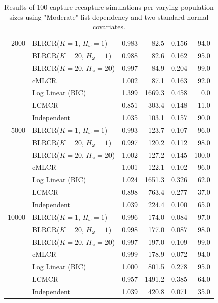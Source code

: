 \documentclass[
  12pt,
]{article}
\begin{document}
\begin{table}[H]
\begin{tabular}{||r l r r r r||}
\hline
2000    & BLRCR($K=1$, $H_\omega=1$)  & 0.983   & 82.5   & 0.156   & 94.0 \\ 
               & BLRCR($K=20$, $H_\omega=1$)   & 0.988     & 82.6     & 0.162     & 95.0 \\ 
               & BLRCR($K=20$, $H_\omega=20$)    & 0.997     & 84.9     & 0.204     & 99.0 \\  
               & cMLCR       & 1.002       & 87.1      & 0.163      & 92.0 \\
               & Log Linear (BIC)  & 1.399      & 1669.3     & 0.458     & 0.0 \\ 
               & LCMCR       & 0.851       & 303.4      & 0.148      & 11.0 \\ 
               & Independent & 1.035 & 103.1& 0.157& 90.0 \\ 


\hline
5000    & BLRCR($K=1$, $H_\omega=1$)  & 0.993   & 123.7   & 0.107   & 96.0 \\ 
               & BLRCR($K=20$, $H_\omega=1$)    & 0.997     & 120.2     & 0.112     & 98.0 \\ 
               & BLRCR($K=20$, $H_\omega=20$)    & 1.002     & 127.2     & 0.145     & 100.0 \\  
               & cMLCR       & 1.001       & 122.1      & 0.102      & 96.0 \\
               & Log Linear (BIC)  & 1.024      & 1651.3     & 0.326     & 62.0 \\ 
               & LCMCR       & 0.898       & 763.4      & 0.277      & 37.0 \\ 
               & Independent & 1.039 & 224.4& 0.100& 65.0 \\ 


\hline
10000    & BLRCR($K=1$, $H_\omega=1$)  & 0.996   & 174.0   & 0.084   & 97.0 \\ 
               & BLRCR($K=20$, $H_\omega=1$)    & 0.998     & 177.0     & 0.087     & 98.0 \\ 
               & BLRCR($K=20$, $H_\omega=20$)    & 0.997     & 197.0     & 0.109     & 99.0 \\  
               & cMLCR       & 0.999       & 178.9      & 0.072      & 94.0 \\
               & Log Linear (BIC)  & 1.000      & 801.5     & 0.278     & 95.0 \\ 
               & LCMCR       & 0.957       & 1491.2      & 0.385      & 64.0 \\ 
               & Independent & 1.039 & 420.8& 0.071& 35.0 \\ 
\hline
\end{tabular}
\caption{Results of 100 capture-recapture simulations per varying population sizes using "Moderate" list dependency and two standard normal covariates. }
\label{table:diffsizes}
\end{table}
\end{document}

